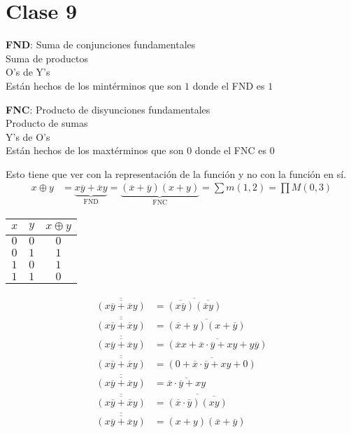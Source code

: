 \documentclass[../main.tex]{subfiles}
\begin{document}
\chapter*{Clase 9}
\thispagestyle{fancy}

\noindent \textbf{FND}: Suma de conjunciones fundamentales\\
Suma de productos\\
O's de Y's\\
Están hechos de los mintérminos que son $1$ donde el FND es $1$

\noindent \textbf{FNC}: Producto de disyunciones fundamentales\\
Producto de sumas\\
Y's de O's\\
Están hechos de los maxtérminos que son $0$ donde el FNC es $0$

Esto tiene que ver con la representación de la función y no con la función en sí.
\begin{align*}
	x\oplus y &= \underbrace{x\overline{y}+\overline{x}y}_{\text{FND}}
	=\underbrace{(\overline{x}+\overline{y})(x+y)}_{\text{FNC}}
	=\sum m(1,2)=\prod M(0,3)
\end{align*}
\begin{center}
	\begin{tabular}{cc|c}
		$x$ & $y$ & $x\oplus y$\\
		\hline
		$0$ & $0$ & $0$\\
		$0$ & $1$ & $1$\\
		$1$ & $0$ & $1$\\
		$1$ & $1$ & $0$
	\end{tabular}
\end{center}
\begin{align*}
	\overline{\overline{(x\overline{y}+\overline{x}y)}} &=
	\overline{\overline{(x\overline{y})}\overline{(\overline{x}y)}}\\
	\overline{\overline{(x\overline{y}+\overline{x}y)}} &=
	\overline{(\overline{x}+y)(x+\overline{y})}\\
	\overline{\overline{(x\overline{y}+\overline{x}y)}} &=
	\overline{(\overline{x}x+\overline{x}\cdot\overline{y}+xy+y\overline{y})}\\
	\overline{\overline{(x\overline{y}+\overline{x}y)}} &=
	\overline{(0+\overline{x}\cdot\overline{y}+xy+0)}\\
	\overline{\overline{(x\overline{y}+\overline{x}y)}} &=
	\overline{\overline{x}\cdot\overline{y}+xy}\\
	\overline{\overline{(x\overline{y}+\overline{x}y)}} &=
	\overline{(\overline{x}\cdot\overline{y})\overline{(xy)}}\\
	\overline{\overline{(x\overline{y}+\overline{x}y)}} &=
	\boxed
	{
		(x+y)(\overline{x}+\overline{y})
	}
\end{align*}
\end{document}
